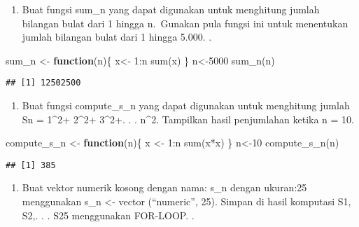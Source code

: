 \documentclass[
]{article}
\newenvironment{Shaded}{\begin{snugshade}}{\end{snugshade}}
\newcommand{\ControlFlowTok}[1]{\textcolor[rgb]{0.13,0.29,0.53}{\textbf{#1}}}
\newcommand{\DecValTok}[1]{\textcolor[rgb]{0.00,0.00,0.81}{#1}}
\newcommand{\FunctionTok}[1]{\textcolor[rgb]{0.00,0.00,0.00}{#1}}
\newcommand{\NormalTok}[1]{#1}
\newcommand{\OtherTok}[1]{\textcolor[rgb]{0.56,0.35,0.01}{#1}}
\newcommand{\SpecialCharTok}[1]{\textcolor[rgb]{0.00,0.00,0.00}{#1}}
\providecommand{\tightlist}{%
  \setlength{\itemsep}{0pt}\setlength{\parskip}{0pt}}
\begin{document}
\begin{enumerate}
\def\labelenumi{\arabic{enumi}.}
\setcounter{enumi}{1}
\tightlist
\item
  Buat fungsi sum\_n yang dapat digunakan untuk menghitung jumlah
  bilangan bulat dari 1 hingga n.~Gunakan pula fungsi ini untuk
  menentukan jumlah bilangan bulat dari 1 hingga 5.000. .
\end{enumerate}

\begin{Shaded}
\begin{Highlighting}[]
\NormalTok{sum\_n }\OtherTok{\textless{}{-}} \ControlFlowTok{function}\NormalTok{(n)\{}
\NormalTok{ x}\OtherTok{\textless{}{-}} \DecValTok{1}\SpecialCharTok{:}\NormalTok{n}
 \FunctionTok{sum}\NormalTok{(x)}
\NormalTok{\}}
\NormalTok{n}\OtherTok{\textless{}{-}}\DecValTok{5000}
\FunctionTok{sum\_n}\NormalTok{(n)}
\end{Highlighting}
\end{Shaded}

\begin{verbatim}
## [1] 12502500
\end{verbatim}

\begin{enumerate}
\def\labelenumi{\arabic{enumi}.}
\setcounter{enumi}{2}
\tightlist
\item
  Buat fungsi compute\_s\_n yang dapat digunakan untuk menghitung jumlah
  Sn = 1\^{}2+ 2\^{}2+ 3\^{}2+. . . n\^{}2. Tampilkan hasil penjumlahan
  ketika n = 10.
\end{enumerate}

\begin{Shaded}
\begin{Highlighting}[]
\NormalTok{compute\_s\_n }\OtherTok{\textless{}{-}} \ControlFlowTok{function}\NormalTok{(n)\{ }
\NormalTok{x }\OtherTok{\textless{}{-}} \DecValTok{1}\SpecialCharTok{:}\NormalTok{n }
\FunctionTok{sum}\NormalTok{(x}\SpecialCharTok{*}\NormalTok{x) }
\NormalTok{\} }
\NormalTok{n}\OtherTok{\textless{}{-}}\DecValTok{10}
\FunctionTok{compute\_s\_n}\NormalTok{(n) }
\end{Highlighting}
\end{Shaded}

\begin{verbatim}
## [1] 385
\end{verbatim}

\begin{enumerate}
\def\labelenumi{\arabic{enumi}.}
\setcounter{enumi}{3}
\tightlist
\item
  Buat vektor numerik kosong dengan nama: s\_n dengan ukuran:25
  menggunakan s\_n \textless- vector (``numeric'', 25). Simpan di hasil
  komputasi S1, S2,. . . S25 menggunakan FOR-LOOP. .
\end{enumerate}
\end{document}
